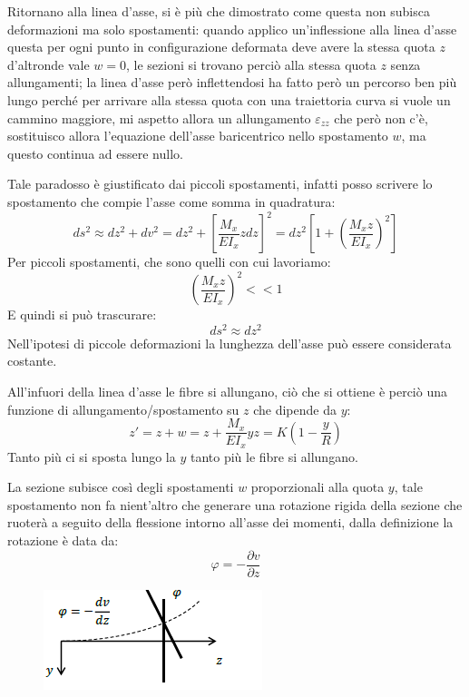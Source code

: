 		Ritornano alla linea d'asse, si è più che dimostrato come questa non subisca deformazioni ma solo spostamenti: quando applico un'inflessione alla linea d'asse questa per ogni punto in configurazione deformata deve avere la stessa quota $z$ d'altronde vale $w=0$, le sezioni si trovano perciò alla stessa quota $z$ senza allungamenti; la linea d'asse però inflettendosi ha fatto però un percorso ben più lungo perché per arrivare alla stessa quota con una traiettoria curva si vuole un cammino maggiore, mi aspetto allora un allungamento $\varepsilon_{zz}$ che però non c'è, sostituisco allora l'equazione dell'asse baricentrico nello spostamento $w$, ma questo continua ad essere nullo. \newline 
		
		Tale paradosso è giustificato dai piccoli spostamenti, infatti posso scrivere lo spostamento che compie l'asse come somma in quadratura:
		\[ ds^2 \approx dz^2 + dv^2 = dz^2 + \left[\dfrac{M_x}{EI_x}zdz\right]^2 = dz^2 \left[1+ \left(\dfrac{M_xz}{EI_x}\right)^2\right] \]
		Per piccoli spostamenti, che sono quelli con cui lavoriamo:
		\[\left(\dfrac{M_xz}{EI_x}\right)^2 << 1\]
		E quindi si può trascurare:
		\[  ds^2 \approx dz^2 \]
		Nell’ipotesi di piccole deformazioni la lunghezza dell’asse può essere considerata costante. \newline
		
		All'infuori della linea d'asse le fibre si allungano, ciò che si ottiene è perciò una funzione di allungamento/spostamento su $z$ che dipende da $y$:
		\[ z' = z + w = z + \dfrac{M_x}{EI_x}yz = K \left(1-\dfrac{y}{R}\right)\]
		Tanto più ci si sposta lungo la $y$ tanto più le fibre si allungano. 
		
		La sezione subisce così degli spostamenti $w$ proporzionali alla quota $y$, tale spostamento non fa nient'altro che generare una rotazione rigida della sezione che ruoterà a seguito della flessione intorno all'asse dei momenti, dalla definizione la rotazione è data da: 
		\[  \varphi = -\dfrac{ \partial v}{ \partial z}\]
		
\begin{figure}[H]
	\centering
	\includegraphics[width=0.5\linewidth]{Immagini_3/screenshot004}
	\label{fig:screenshot004}
\end{figure}


